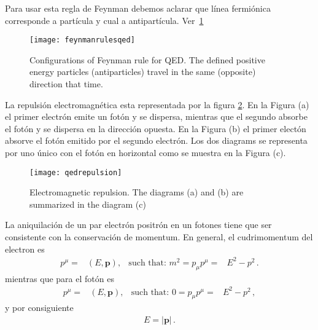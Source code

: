 Para usar esta regla de Feynman debemos aclarar que línea fermiónica corresponde a partícula y cual a antipartícula.
Ver~\ref{fig:feynmanrulesqed}


\begin{frame}
\begin{figure}
  \centering
  \texttt{[image: feynmanrulesqed]} %
  \caption{Configurations of Feynman rule for QED. The defined positive energy particles (antiparticles) travel in the same (opposite) direction that time. }
  \label{fig:feynmanrulesqed}
\end{figure}
\end{frame}


La repulsión electromagnética esta representada por la figura \ref{fig:qedrepulsion}. En la Figura (a) el primer electrón emite un fotón y se dispersa, mientras que el segundo absorbe el fotón y se dispersa en la dirección opuesta. En la Figura (b) el primer electón absorve el fotón emitido por el segundo electrón. Los dos diagrams se representa por uno único con el fotón en horizontal como se muestra en la Figura (c).

\begin{frame}
\begin{figure}
  \centering
  \texttt{[image: qedrepulsion]}
  \caption{Electromagnetic repulsion. The diagrams (a) and (b) are summarized in the diagram (c)}
  \label{fig:qedrepulsion}
\end{figure}
\end{frame}

La aniquilación de un par electrón positrón en un fotones tiene que ser consistente con la conservación de momentum. En general, el cudrimomentum del electron es
\begin{align}
  p^\mu=&(E,\boldsymbol{p}),& \text{such that: }  m^2=p_{\mu}p^{\mu}=& E^2-p^2\,.
\end{align}
mientras que para el fotón es
\begin{align}
  p^\mu=&(E,\boldsymbol{p}),& \text{such that: }  0=p_{\mu}p^{\mu}=& E^2-p^2\,,
\end{align}
y por consiguiente
\begin{align}
  E=|\boldsymbol{p}|\,.
\end{align}

